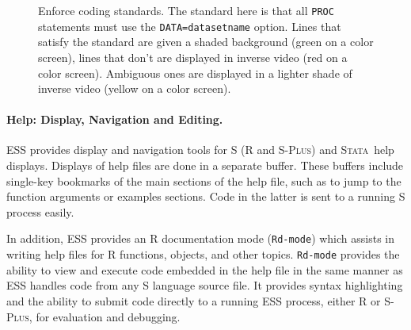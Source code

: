 \documentclass{article}
\newcommand*{\Splus}{\textsc{S-Plus}}
\newcommand*{\Stata}{\textsc{Stata}}
\newcommand{\stexttt}[1]{{\small\texttt{#1}}}
\begin{document}
\begin{figure}[tbp]
  \caption{Enforce coding standards.  The standard here is
    that all \stexttt{PROC} statements must use the
    \stexttt{DATA=datasetname} option.  Lines that satisfy the
    standard are given a shaded background (green on a color screen),
    lines that don't are
    displayed in inverse video (red on a color screen).
  Ambiguous ones are displayed in a
    lighter shade of inverse video (yellow on a color screen).}
  \label{f.hilock}
\end{figure}

\paragraph{Help: Display, Navigation and Editing.}
ESS provides display and navigation tools for S (R and \Splus) and
\Stata\ help displays.  Displays of help files are done in a separate
buffer.  These buffers include single-key bookmarks of the main
sections of the help file, such as to jump to the function arguments or
examples sections.  Code in the latter is sent to a running S process
easily. %

In addition, ESS provides an R documentation mode (\stexttt{Rd-mode})
which assists in writing help files for R functions, objects, and
other topics.  \stexttt{Rd-mode} provides the ability to view and
execute code embedded in the help file in the same manner as ESS
handles code from any S language source file.  It provides syntax
highlighting and the ability to submit code directly to a running ESS
process, either R or \Splus, for evaluation and debugging.

\end{document}
